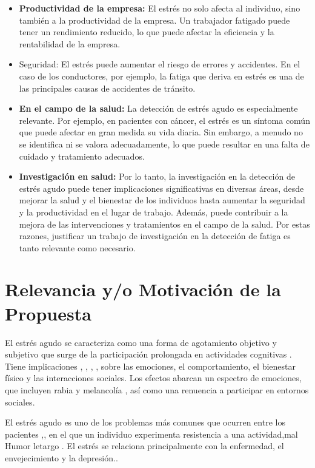 \begin{itemize}
  \item \textbf{Productividad de la empresa:} El estrés no solo afecta al individuo, sino también a la productividad de la empresa. Un trabajador fatigado puede tener un rendimiento reducido, lo que puede afectar la eficiencia y la rentabilidad de la empresa.
  \item Seguridad: El estrés  puede aumentar el riesgo de errores y accidentes. En el caso de los conductores, por ejemplo, la fatiga que deriva en estrés  es una de las principales causas de accidentes de tránsito.
  \item  \textbf{En el campo de la salud:} La detección de estrés agudo es especialmente relevante. Por ejemplo, en pacientes con cáncer, el estrés es un síntoma común que puede afectar en gran medida su vida diaria. Sin embargo, a menudo no se identifica ni se valora adecuadamente, lo que puede resultar en una falta de cuidado y tratamiento adecuados.
  \item \textbf{Investigación en salud:} Por lo tanto, la investigación en la detección de estrés agudo puede tener implicaciones significativas en diversas áreas, desde mejorar la salud y el bienestar de los individuos hasta aumentar la seguridad y la productividad en el lugar de trabajo. Además, puede contribuir a la mejora de las intervenciones y tratamientos en el campo de la salud. Por estas razones, justificar un trabajo de investigación en la detección de fatiga es tanto relevante como necesario.

\end{itemize}


\section{Relevancia y/o Motivación de la Propuesta}




El estrés agudo  se caracteriza como una forma de agotamiento objetivo y subjetivo que surge de la participación prolongada en actividades cognitivas \cite{ishii2014neural}. Tiene implicaciones \cite{grillon2015mental} , \cite{brown2019effects} , \cite{van2017effects} , \cite{dogan2023multi} , \cite{cropanzano2003relationship} sobre las emociones, el comportamiento, el bienestar físico y las interacciones sociales. Los efectos abarcan un espectro de emociones, que incluyen rabia y melancolía , así como una renuencia a participar en entornos sociales.

El estrés agudo es uno de los problemas más comunes que ocurren entre los pacientes \cite{martin2018mental},\cite{marcora2009mental}, en el que un individuo experimenta resistencia a una actividad\cite{meijman2000theory},mal  Humor\cite{hockey1983stress}  letargo \cite{martin2018mental}.
El estrés  se relaciona principalmente con la enfermedad, el envejecimiento
y la depresión.\cite{martin2018mental}.

